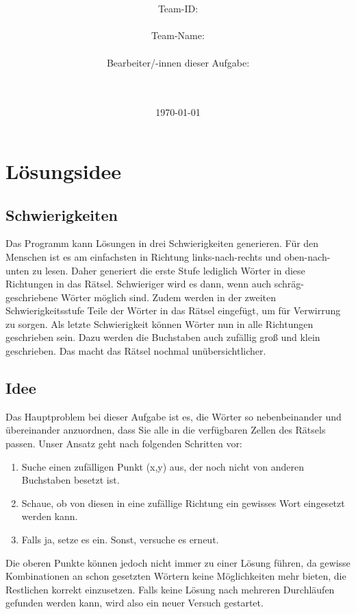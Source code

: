 \documentclass[a4paper,10pt,ngerman]{scrartcl}
\title{\textbf{\Huge\Aufgabe}}
\author{\LARGE Team-ID: \LARGE \TeamId \\\\
	    \LARGE Team-Name: \LARGE \TeamName \\\\
	    \LARGE Bearbeiter/-innen dieser Aufgabe: \\ 
	    \LARGE \Namen\\\\}
\date{\LARGE\today}
\begin{document}
\maketitle
\tableofcontents

\vspace{0.5cm}

\section{Lösungsidee}
\subsection{Schwierigkeiten}
Das Programm kann Lösungen in drei Schwierigkeiten generieren.
Für den Menschen ist es am einfachsten in Richtung links-nach-rechts und oben-nach-unten zu lesen.
Daher generiert die erste Stufe lediglich Wörter in diese Richtungen in das Rätsel.
Schwieriger wird es dann, wenn auch schräg-geschriebene Wörter möglich sind. Zudem werden in der
zweiten Schwierigkeitsstufe Teile der Wörter in das Rätsel eingefügt, um für Verwirrung zu sorgen.
Als letzte Schwierigkeit können Wörter nun in alle Richtungen geschrieben sein. Dazu werden
die Buchstaben auch zufällig groß und klein geschrieben. Das macht das Rätsel nochmal unübersichtlicher. 
\subsection{Idee}
Das Hauptproblem bei dieser Aufgabe ist es, die Wörter so nebenbeinander und übereinander anzuordnen, dass
Sie alle in die verfügbaren Zellen des Rätsels passen. Unser Ansatz geht nach folgenden Schritten vor:
\begin{enumerate}
	\item Suche einen zufälligen Punkt (x,y) aus, der noch nicht von anderen Buchstaben besetzt ist.
	\item Schaue, ob von diesen in eine zufällige Richtung ein gewisses Wort eingesetzt werden kann.
	\item Falls ja, setze es ein. Sonst, versuche es erneut.
\end{enumerate}
Die oberen Punkte können jedoch nicht immer zu einer Lösung führen, da gewisse Kombinationen an schon
gesetzten Wörtern keine Möglichkeiten mehr bieten, die Restlichen korrekt einzusetzen.
Falls keine Lösung nach mehreren Durchläufen gefunden werden kann, wird also ein neuer Versuch gestartet.
\end{document}
